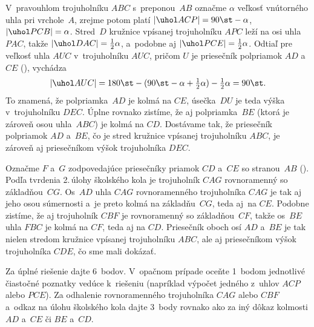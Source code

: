 {%
V~pravouhlom trojuholníku $ABC$ s~preponou~$AB$ označme $\alpha$ veľkosť vnútorného uhla pri vrchole~$A$, zrejme potom platí $|\uhol ACP|=90\st-\alpha$, $|\uhol PCB|=\alpha$. Stred~$D$ kružnice vpísanej trojuholníku $APC$ leží na osi uhla $PAC$, takže $|\uhol DAC|=\frac12\alpha$, a~podobne aj $|\uhol PCE|=\frac12\alpha$. Odtiaľ pre veľkosť uhla $AUC$ v~trojuholníku $AUC$, pričom $U$ je priesečník polpriamok $AD$ a~$CE$ (\obr), vychádza
$$
|\uhol AUC|=180\st-(90\st-\alpha+\tfrac12\alpha)-\tfrac12\alpha=90\st.
$$
To znamená, že polpriamka~$AD$ je kolmá na $CE$, úsečka~$DU$ je teda výška v~trojuholníku $DEC$. Úplne rovnako zistíme, že aj polpriamka~$BE$ (ktorá je zároveň osou uhla~$ABC$) je kolmá na $CD$. Dostávame tak, že priesečník polpriamok $AD$ a~$BE$, čo je stred kružnice vpísanej trojuholníku $ABC$, je zároveň aj priesečníkom výšok trojuholníka $DEC$.
%

\ineriesenie
Označme $F$ a~$G$ zodpovedajúce priesečníky priamok $CD$ a~$CE$ so stranou~$AB$ (\obr).
%
Podľa tvrdenia 2.\,úlohy školského kola je trojuholník $CAG$ rovnoramenný so základňou~$CG$. Os~$AD$ uhla $CAG$ rovnoramenného trojuholníka $CAG$ je tak aj jeho osou súmernosti a~je preto kolmá na základňu~$CG$, teda aj~na $CE$.
Podobne zistíme, že aj trojuholník $CBF$ je rovnoramenný so základňou~$CF$, takže os~$BE$ uhla $FBC$ je kolmá na $CF$, teda aj na $CD$. Priesečník oboch osí $AD$ a~$BE$ je tak nielen stredom kružnice vpísanej trojuholníku $ABC$, ale aj priesečníkom výšok trojuholníka $CDE$, čo sme mali dokázať.

\nobreak\medskip\petit\noindent
Za úplné riešenie dajte 6~bodov. V~opačnom prípade oceňte 1~bodom jednotlivé čiastočné poznatky vedúce k~riešeniu (napríklad výpočet jedného z~uhlov $ACP$ alebo $PCE$). Za odhalenie rovnoramenného trojuholníka $CAG$ alebo $CBF$ a~odkaz na úlohu školského kola dajte 3~body rovnako ako za iný dôkaz kolmosti $AD$ a~$CE$ či $BE$ a~$CD$.
\endpetit
\bigbreak}

